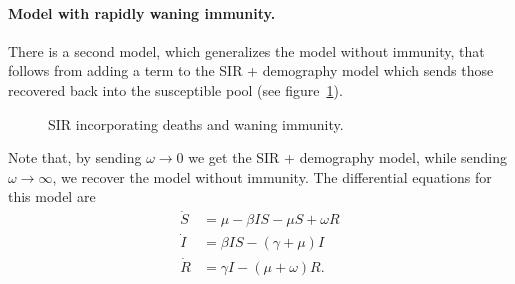 \documentclass[12pt]{article}
\begin{document}
\paragraph{Model with rapidly waning immunity.} There is a second model, which generalizes the model without immunity, that follows from adding a term to the SIR + demography model which sends those recovered back into the susceptible pool (see figure~\ref{fig:sir-immunity}).
\begin{figure}[ht!]
\centering
{}
\caption{SIR incorporating deaths and waning immunity.}
\label{fig:sir-immunity}
\end{figure}
Note that, by sending $\omega \to 0$ we get the SIR + demography model, while sending $\omega \to \infty$, we recover the model without immunity. The differential equations for this model are
\[
\begin{aligned}
	\dot S &= \mu - \beta IS - \mu S + \omega R\\
	\dot I &= \beta IS - (\gamma + \mu) I\\
	\dot R &= \gamma I - (\mu + \omega) R.
\end{aligned}
\]
\end{document}
